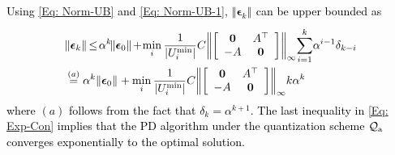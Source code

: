 \documentclass[10pt,twocolumn,twoside]{IEEEtran}
\begin{document}
\textcolor{black}{Using \eqref{Eq: Norm-UB} and \eqref{Eq: Norm-UB-1}, ${\left\Vert{{\ensuremath{\boldsymbol{{\epsilon}}}}_k}\right\Vert_{{}}}$ can be upper bounded as 
\begin{align}\label{Eq: Exp-Con}
&{\left\Vert{{{\ensuremath{\boldsymbol{{\epsilon}}}}_k}}\right\Vert_{{}}}\!\leq\! 
\alpha^k\!{\left\Vert{{\ensuremath{\boldsymbol{{\epsilon}}}}_{0}}\right\Vert_{{}}}\!+\!\min_i\frac{1}{{\left|{U^{\rm min}_i}\right|}}C
{\left\Vert{
\left[
\begin{array}{cc}
{\ensuremath{\boldsymbol{{0}}}}&A^\top\\
-A&{\ensuremath{\boldsymbol{{0}}}}
\end{array}
\right]}\right\Vert_{{\infty}}}\!\sum_{i=1}^{k}\!\alpha^{i-1}\delta_{k-i}\nonumber\\
&\stackrel{(a)}{=} \alpha^k{\left\Vert{{\ensuremath{\boldsymbol{{\epsilon}}}}_{0}}\right\Vert_{{}}}+\min_i\frac{1}{{\left|{U^{\rm min}_i}\right|}}C
{\left\Vert{
\left[
\begin{array}{cc}
{\ensuremath{\boldsymbol{{0}}}}&A^\top\\
-A&{\ensuremath{\boldsymbol{{0}}}}
\end{array}
\right]}\right\Vert_{{\infty}}}k\alpha^k
\end{align}
where $(a)$ follows from the fact that $\delta_k=\alpha^{k+1}$. The last inequality in \eqref{Eq: Exp-Con} implies that the PD algorithm under the quantization scheme $\mathcal{Q}_{\rm a }$ converges exponentially to the optimal solution.}

\end{document}
